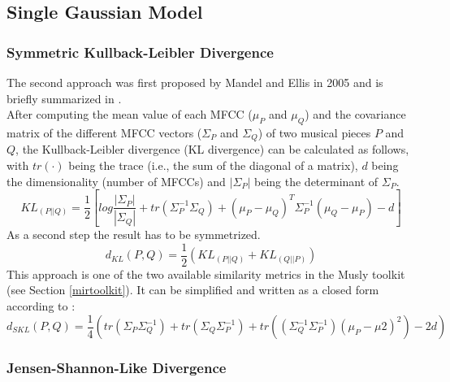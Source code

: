 \subsection{Single Gaussian Model}

\subsubsection{Symmetric Kullback-Leibler Divergence}\label{klth}

The second approach was first proposed by Mandel and Ellis in 2005 \cite{mandelellis1} and is briefly summarized in \cite[pp. 65f]{knees1}.\\
After computing the mean value of each MFCC ($\mu_P$ and $\mu_Q$) and the covariance matrix of the different MFCC vectors ($\Sigma_P$ and $\Sigma_Q$) of two musical pieces $P$ and $Q$, the Kullback-Leibler divergence (KL divergence) can be calculated as follows, with $tr(\cdot)$ being the trace (i.e., the sum of the diagonal of a matrix), $d$ being the dimensionality (number of MFCCs) and $|\Sigma_P|$ being the determinant of $\Sigma_P$.\\
\begin{equation} \label{eq:KL1}
KL_{(P||Q)} = \frac{1}{2}[log\frac{|\Sigma_P|}{|\Sigma_Q|} + tr(\Sigma_P^{-1}\Sigma_Q) + (\mu_P - \mu_Q)^T \Sigma_P^{-1} (\mu_Q - \mu_P) - d]
\end{equation}
As a second step the result has to be symmetrized.
\begin{equation} \label{eq:KL2}
d_{KL}(P, Q) = \frac{1}{2} (KL_{(P||Q)} + KL_{(Q||P)}) 
\end{equation}
This approach is one of the two available similarity metrics in the Musly \cite{musly1} toolkit (see Section \ref{mirtoolkit}). It can be simplified and written as a closed form according to \cite[p. 44]{schnitzer1}:
\begin{equation} \label{eq:SKL}
d_{SKL}(P, Q) = \frac{1}{4} (tr(\Sigma_P\Sigma_Q^{-1}) + tr(\Sigma_Q\Sigma_P^{-1}) + tr((\Sigma_Q^{-1}\Sigma_P^{-1})(\mu_P - \mu2)^2) - 2d)
\end{equation}

\subsubsection{Jensen-Shannon-Like Divergence}

